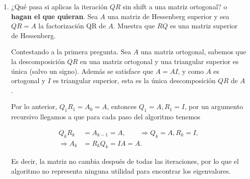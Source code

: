 \documentclass{article}
\begin{document}
\begin{enumerate}
\begin{proof}
        Sea entonces $p(\lambda)$ cualquier polinomio de orden mayor a 4. Sabemos que podemos encontrar una matriz $A$
        acompañante de $p(\lambda)$ tal que los eigenvalores de $A$ son las raíces de $p(\lambda)$.
        Aplicando nuestro algoritmo, podemos encontrar los eigenvalores de $A$ en una cantidad finita de
        transformaciones de Householder. Pero las transformaciones de Householder son tranformaciones
        lineales, por lo que en particular son operaciones algebraicas. 
        
        Lo anterior significa que podemos encontrar las raíces de cualquier polinomio de grado 
        mayor que 4 usando una cantidad finita de operaciones algebraicas, lo que es una 
        contradicción del Teorema de Abel-Rufini.
    
    \end{proof}

    \item ¿Qué pasa si aplicas la iteración $QR$ sin shift a una matriz ortogonal? 
    o \textbf{hagan el que quieran}. Sea $A$ una matriz de Hessenberg superior y sea $QR = A$ 
    la factorización QR de $A$. Muestra que $RQ$ es una matriz superior de Hessenberg.
    
    Contestando a la primera pregunta. Sea $A$ una matriz ortogonal, sabemos que la descomposición 
    $QR$ en una matriz ortogonal y una triangular superior es única (salvo un signo). Además se 
    satisface que $A = AI$, y como $A$ es ortogonal y $I$ es triangular superior, esta es la única
    descomposición $QR$ de $A$. 
    
    Por lo anterior, $Q_1 R_1 = A_0 = A$, entonces $Q_1 = A, R_1 = I$, por un argumento recursivo
    llegamos a que para cada paso del algoritmo tenemos

    \begin{align*}
        Q_{k}R_{k} &= A_{k-1} = A, \qquad \Rightarrow Q_{k} = A, R_{k} = I,\\
        \Rightarrow A_k &= R_k Q_k = I A = A.
    \end{align*}

    Es decir, la matriz no cambia después de todas las iteraciones, por lo que el algoritmo no 
    representa ninguna utilidad para encontrar los eigenvalores.

\end{enumerate}




 
\end{document}
